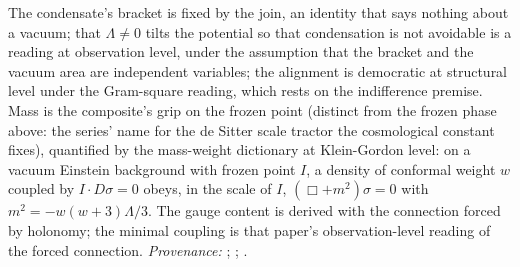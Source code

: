 The condensate's bracket is fixed by the join, an identity that says nothing about a vacuum; that $\Lambda \neq 0$ tilts the potential so that condensation is not avoidable is a reading at observation level, under the assumption that the bracket and the vacuum area are independent variables; the alignment is democratic at structural level under the Gram-square reading, which rests on the indifference premise. Mass is the composite's grip on the frozen point (distinct from the frozen phase above: the series' name for the de Sitter scale tractor the cosmological constant fixes), quantified by the mass-weight dictionary at Klein-Gordon level: on a vacuum Einstein background with frozen point $I$, a density of conformal weight $w$ coupled by $I \cdot D\sigma = 0$ obeys, in the scale of $I$, $(\Box + m^{2})\sigma = 0$ with $m^{2} = -w(w+3)\Lambda/3$. The gauge content is derived with the connection forced by holonomy; the minimal coupling is that paper's observation-level reading of the forced connection. \emph{Provenance:} \cite[Prop.~4.1, Prop.~4.2(2), Prop.~4.3(3)]{ButlerT13}; \cite[Thm.~3.1, Lem.~5.1, Def.~5.4, Thm.~5.6]{ButlerT11}; \cite[Prop.~5.7 and the paragraph following it]{ButlerT12}.
